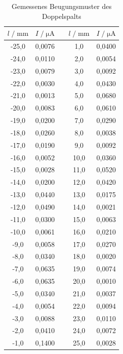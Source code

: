 \begin{table}
            \centering
            \caption{Gemessenes Beugungsmuster des Doppelspalts}
            \label{tab:mess3}
            \begin{tabular}{c c c c c}
            \toprule
            $ l \;/\; \si{\milli\meter} $ & $I \;/\; \si{\micro\ampere}$ & &
            $ l \;/\; \si{\milli\meter} $ & $I \;/\; \si{\micro\ampere}$ \\
            \midrule 
            -25,0 & 0,0076 & \; &  1,0 & 0,0400 \\
            -24,0 & 0,0110 & \; &  2,0 & 0,0054 \\
            -23,0 & 0,0079 & \; &  3,0 & 0,0092 \\
            -22,0 & 0,0030 & \; &  4,0 & 0,0430 \\
            -21,0 & 0,0013 & \; &  5,0 & 0,0680 \\
            -20,0 & 0,0083 & \; &  6,0 & 0,0610 \\
            -19,0 & 0,0200 & \; &  7,0 & 0,0290 \\
            -18,0 & 0,0260 & \; &  8,0 & 0,0038 \\
            -17,0 & 0,0190 & \; &  9,0 & 0,0092 \\
            -16,0 & 0,0052 & \; & 10,0 & 0,0360 \\
            -15,0 & 0,0028 & \; & 11,0 & 0,0520 \\
            -14,0 & 0,0200 & \; & 12,0 & 0,0420 \\
            -13,0 & 0,0440 & \; & 13,0 & 0,0175 \\
            -12,0 & 0,0490 & \; & 14,0 & 0,0021 \\
            -11,0 & 0,0300 & \; & 15,0 & 0,0063 \\
            -10,0 & 0,0061 & \; & 16,0 & 0,0210 \\
             -9,0 & 0,0058 & \; & 17,0 & 0,0270 \\
             -8,0 & 0,0340 & \; & 18,0 & 0,0020 \\
             -7,0 & 0,0635 & \; & 19,0 & 0,0074 \\
             -6,0 & 0,0635 & \; & 20,0 & 0,0010 \\
             -5,0 & 0,0340 & \; & 21,0 & 0,0037 \\
             -4,0 & 0,0054 & \; & 22,0 & 0,0094 \\
             -3,0 & 0,0088 & \; & 23,0 & 0,0110 \\
             -2,0 & 0,0410 & \; & 24,0 & 0,0072 \\
             -1,0 & 0,1400 & \; & 25,0 & 0,0028 \\
            \bottomrule
            \end{tabular}
    \end{table}

